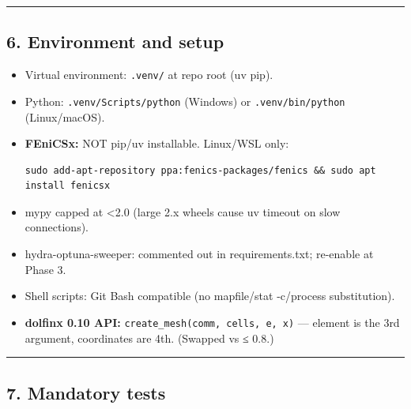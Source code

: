 \documentclass[
]{article}
\begin{document}
\begin{center}\rule{0.5\linewidth}{0.5pt}\end{center}

\subsection{6. Environment and setup}\label{environment-and-setup}

\begin{itemize}
\item
  Virtual environment: \texttt{.venv/} at repo root (uv pip).
\item
  Python: \texttt{.venv/Scripts/python} (Windows) or
  \texttt{.venv/bin/python} (Linux/macOS).
\item
  \textbf{FEniCSx:} NOT pip/uv installable. Linux/WSL only:

\begin{verbatim}
sudo add-apt-repository ppa:fenics-packages/fenics && sudo apt install fenicsx
\end{verbatim}
\item
  mypy capped at \textless2.0 (large 2.x wheels cause uv timeout on slow
  connections).
\item
  hydra-optuna-sweeper: commented out in requirements.txt; re-enable at
  Phase 3.
\item
  Shell scripts: Git Bash compatible (no mapfile/stat -c/process
  substitution).
\item
  \textbf{dolfinx 0.10 API:} \texttt{create\_mesh(comm,\ cells,\ e,\ x)}
  --- element is the 3rd argument, coordinates are 4th. (Swapped vs ≤
  0.8.)
\end{itemize}

\begin{center}\rule{0.5\linewidth}{0.5pt}\end{center}

\subsection{7. Mandatory tests}\label{mandatory-tests}
\end{document}
